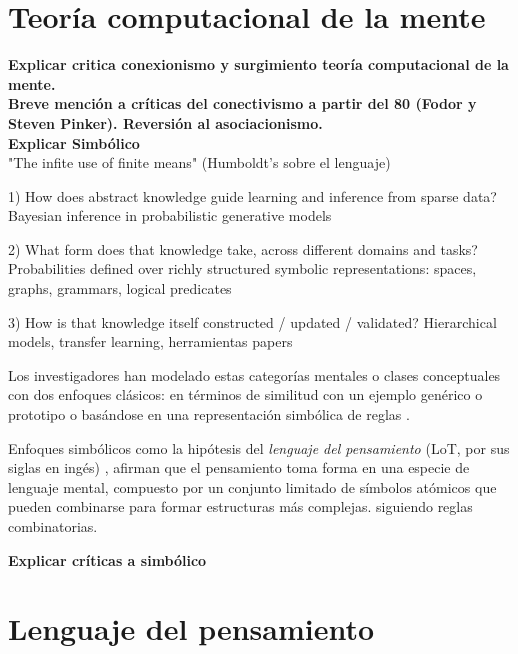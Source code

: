 





\section{Teoría computacional de la mente}
\textbf{Explicar critica conexionismo y surgimiento teoría computacional de la mente.} \\
\textbf{Breve mención a críticas del conectivismo a partir del 80 (Fodor y Steven Pinker). Reversión al asociacionismo.}\\
\textbf{Explicar Simbólico}\\

"The infite use of finite means" (Humboldt's sobre el lenguaje)

1) How does abstract knowledge guide learning and inference from sparse data?
Bayesian inference in probabilistic generative models

2) What form does that knowledge take, across different domains and tasks?
Probabilities defined over richly structured symbolic representations: spaces, graphs, grammars, logical predicates

3) How is that knowledge itself constructed / updated / validated?
Hierarchical models, transfer learning, herramientas papers


Los investigadores han modelado estas categorías mentales o clases conceptuales con dos enfoques clásicos: en términos de similitud con un ejemplo genérico o prototipo \cite{rosch1999principles, nosofsky1986attention, rosch1976structural, rosch1975family} o basándose en una representación simbólica de reglas \cite{boole1854investigation, fodor1975language, gentner1983structure}.

Enfoques simbólicos como la hipótesis del \textit{lenguaje del pensamiento} (LoT, por sus siglas en ingés) \cite{fodor1975language}, afirman que el pensamiento toma forma en una especie de lenguaje mental, compuesto por un conjunto limitado de símbolos atómicos que pueden combinarse para formar estructuras más complejas. siguiendo reglas combinatorias.

\textbf{Explicar críticas a simbólico} \cite{blackburn1984spreading, loewer1991meaning, knowles1998language, aydede1997language} \\


\section{Lenguaje del pensamiento}

